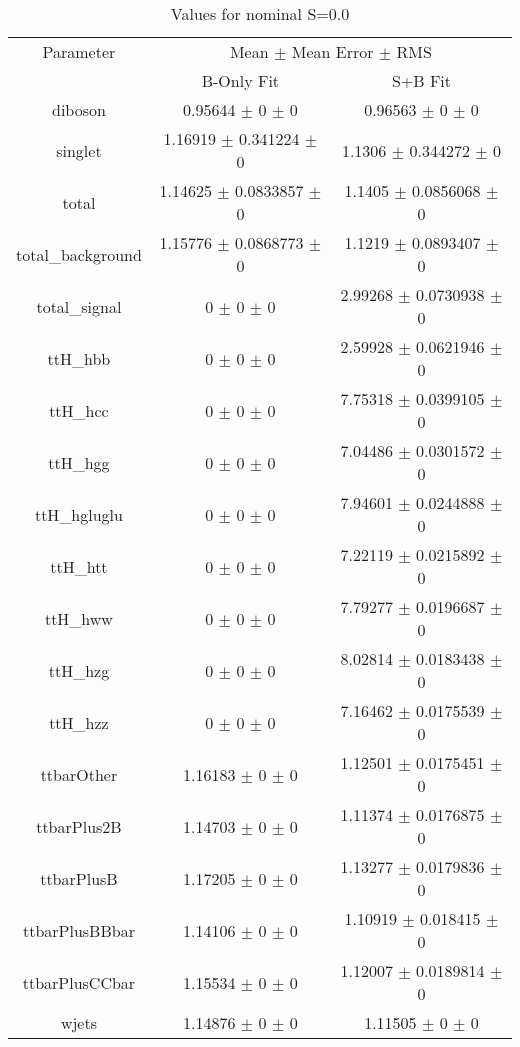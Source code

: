 \begin{table}
\centering
\caption{Values for nominal S=0.0}
\begin{tabular}{ccc}
\toprule
Parameter & \multicolumn{2}{c}{Mean $\pm$ Mean Error $\pm$ RMS}\\
 & B-Only Fit & S+B Fit\\
\midrule
diboson & \num{0.95644} $\pm$ \num{0} $\pm$ \num{0} & \num{0.96563} $\pm$ \num{0} $\pm$ \num{0}\\
singlet & \num{1.16919} $\pm$ \num{0.341224} $\pm$ \num{0} & \num{1.1306} $\pm$ \num{0.344272} $\pm$ \num{0}\\
total & \num{1.14625} $\pm$ \num{0.0833857} $\pm$ \num{0} & \num{1.1405} $\pm$ \num{0.0856068} $\pm$ \num{0}\\
total\_background & \num{1.15776} $\pm$ \num{0.0868773} $\pm$ \num{0} & \num{1.1219} $\pm$ \num{0.0893407} $\pm$ \num{0}\\
total\_signal & \num{0} $\pm$ \num{0} $\pm$ \num{0} & \num{2.99268} $\pm$ \num{0.0730938} $\pm$ \num{0}\\
ttH\_hbb & \num{0} $\pm$ \num{0} $\pm$ \num{0} & \num{2.59928} $\pm$ \num{0.0621946} $\pm$ \num{0}\\
ttH\_hcc & \num{0} $\pm$ \num{0} $\pm$ \num{0} & \num{7.75318} $\pm$ \num{0.0399105} $\pm$ \num{0}\\
ttH\_hgg & \num{0} $\pm$ \num{0} $\pm$ \num{0} & \num{7.04486} $\pm$ \num{0.0301572} $\pm$ \num{0}\\
ttH\_hgluglu & \num{0} $\pm$ \num{0} $\pm$ \num{0} & \num{7.94601} $\pm$ \num{0.0244888} $\pm$ \num{0}\\
ttH\_htt & \num{0} $\pm$ \num{0} $\pm$ \num{0} & \num{7.22119} $\pm$ \num{0.0215892} $\pm$ \num{0}\\
ttH\_hww & \num{0} $\pm$ \num{0} $\pm$ \num{0} & \num{7.79277} $\pm$ \num{0.0196687} $\pm$ \num{0}\\
ttH\_hzg & \num{0} $\pm$ \num{0} $\pm$ \num{0} & \num{8.02814} $\pm$ \num{0.0183438} $\pm$ \num{0}\\
ttH\_hzz & \num{0} $\pm$ \num{0} $\pm$ \num{0} & \num{7.16462} $\pm$ \num{0.0175539} $\pm$ \num{0}\\
ttbarOther & \num{1.16183} $\pm$ \num{0} $\pm$ \num{0} & \num{1.12501} $\pm$ \num{0.0175451} $\pm$ \num{0}\\
ttbarPlus2B & \num{1.14703} $\pm$ \num{0} $\pm$ \num{0} & \num{1.11374} $\pm$ \num{0.0176875} $\pm$ \num{0}\\
ttbarPlusB & \num{1.17205} $\pm$ \num{0} $\pm$ \num{0} & \num{1.13277} $\pm$ \num{0.0179836} $\pm$ \num{0}\\
ttbarPlusBBbar & \num{1.14106} $\pm$ \num{0} $\pm$ \num{0} & \num{1.10919} $\pm$ \num{0.018415} $\pm$ \num{0}\\
ttbarPlusCCbar & \num{1.15534} $\pm$ \num{0} $\pm$ \num{0} & \num{1.12007} $\pm$ \num{0.0189814} $\pm$ \num{0}\\
wjets & \num{1.14876} $\pm$ \num{0} $\pm$ \num{0} & \num{1.11505} $\pm$ \num{0} $\pm$ \num{0}\\
\bottomrule
\end{tabular}
\end{table}